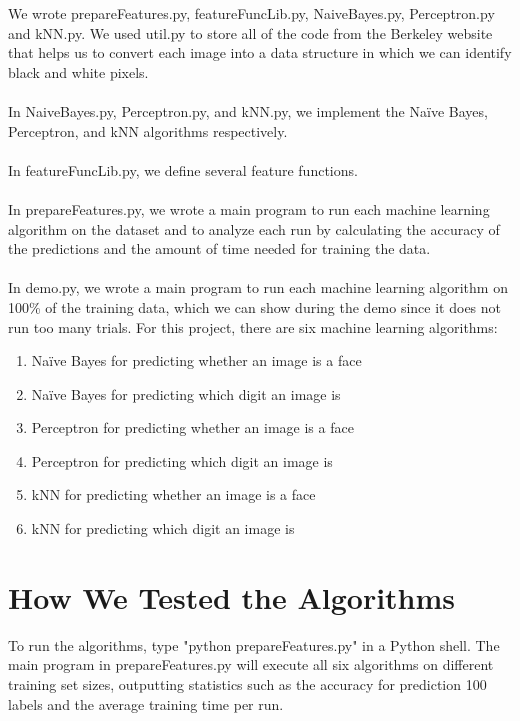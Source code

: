 \documentclass{article}
\begin{document}
We wrote prepareFeatures.py, featureFuncLib.py, NaiveBayes.py, Perceptron.py and kNN.py. We used util.py to store all of the code from the Berkeley website that helps us to convert each image into a data structure in which we can identify black and white pixels. \\\\
In NaiveBayes.py, Perceptron.py, and kNN.py, we implement the Naïve Bayes, Perceptron, and kNN algorithms respectively. \\\\
In featureFuncLib.py, we define several feature functions.\\\\
In prepareFeatures.py, we wrote a main program to run each machine learning algorithm on the dataset and to analyze each run by calculating the accuracy of the predictions and the amount of time needed for training the data. \\\\
In demo.py, we wrote a main program to run each machine learning algorithm on 100\% of the training data, which we can show during the demo since it does not run too many trials. 
For this project, there are six machine learning algorithms: 
\begin{enumerate}
	\item Naïve Bayes for predicting whether an image is a face
	\item Naïve Bayes for predicting which digit an image is
	\item Perceptron for predicting whether an image is a face
	\item Perceptron for predicting which digit an image is
	\item kNN for predicting whether an image is a face
	\item kNN for predicting which digit an image is
\end{enumerate}

\section{How We Tested the Algorithms}

To run the algorithms, type "python prepareFeatures.py" in a Python shell. The main program in prepareFeatures.py will execute all six algorithms on different training set sizes, outputting statistics such as the accuracy for prediction 100 labels and the average training time per run.\\
\end{document}
